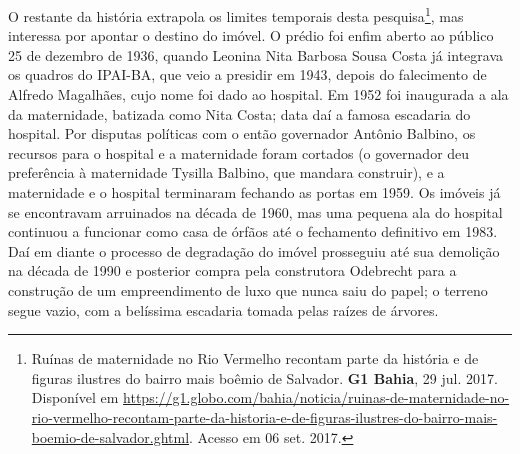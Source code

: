 
O restante da história extrapola os limites temporais desta pesquisa\footnote{Ruínas de maternidade no Rio Vermelho recontam parte da história e de figuras ilustres do bairro mais boêmio de Salvador. \textbf{G1 Bahia}, 29 jul. 2017. Disponível em \url{https://g1.globo.com/bahia/noticia/ruinas-de-maternidade-no-rio-vermelho-recontam-parte-da-historia-e-de-figuras-ilustres-do-bairro-mais-boemio-de-salvador.ghtml}. Acesso em 06 set. 2017.}, mas interessa por apontar o destino do imóvel. O prédio foi enfim aberto ao público 25 de dezembro de 1936, quando Leonina Nita Barbosa Sousa Costa já integrava os quadros do IPAI-BA, que veio a presidir em 1943, depois do falecimento de Alfredo Magalhães, cujo nome foi dado ao hospital. Em 1952 foi inaugurada a ala da maternidade, batizada como Nita Costa; data daí a famosa escadaria do hospital. Por disputas políticas com o então governador Antônio Balbino, os recursos para o hospital e a maternidade foram cortados (o governador deu preferência à maternidade Tysilla Balbino, que mandara construir), e a maternidade e o hospital terminaram fechando as portas em 1959. Os imóveis já se encontravam arruinados na década de 1960, mas uma pequena ala do hospital continuou a funcionar como casa de órfãos até o fechamento definitivo em 1983. Daí em diante o processo de degradação do imóvel prosseguiu até sua demolição na década de 1990 e posterior compra pela construtora Odebrecht para a construção de um empreendimento de luxo que nunca saiu do papel; o terreno segue vazio, com a belíssima escadaria tomada pelas raízes de árvores.

